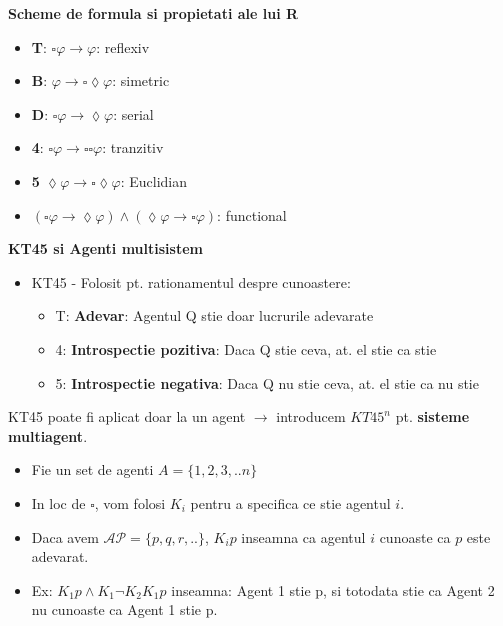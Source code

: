 \documentclass[10pt,a4paper,twocolumn]{report}
\begin{document}
\textbf{Scheme de formula si propietati ale lui R}
\begin{itemize}
\item \textbf{T}: $\square \varphi \rightarrow \varphi$: reflexiv
\item \textbf{B}: $\varphi \rightarrow \square \lozenge \varphi$: simetric
\item \textbf{D}: $\square \varphi \rightarrow \lozenge \varphi$: serial
\item \textbf{4}: $\square \varphi \rightarrow \square \square \varphi$: tranzitiv
\item \textbf{5} $\lozenge \varphi \rightarrow \square \lozenge \varphi$: Euclidian
\item $(\square \varphi \rightarrow \lozenge \varphi) \wedge (\lozenge \varphi \rightarrow \square \varphi)$: functional
\end{itemize}

\textbf{KT45 si Agenti multisistem}
\begin{itemize}

\item KT45 - Folosit pt. rationamentul despre cunoastere:

	\begin{itemize}
	\item T: \textbf{Adevar}: Agentul Q stie doar lucrurile adevarate
	\item 4: \textbf{Introspectie pozitiva}: Daca Q stie ceva, at. el stie ca stie
	\item 5: \textbf{Introspectie negativa}: Daca Q nu stie ceva, at. el stie ca nu stie
	\end{itemize}

\end{itemize}
\vspace{40mm}

KT45 poate fi aplicat doar la un agent $\rightarrow$ introducem $KT45^n$ pt. \textbf{sisteme multiagent}.

\begin{itemize}
\item Fie un set de agenti $A = \{1,2,3,..n\}$
\item In loc de $\square$, vom folosi $K_i$ pentru a specifica ce stie agentul $i$.
\item Daca avem $\mathcal{AP} = \{p, q, r, ..\}$, $K_ip$ inseamna ca agentul $i$ cunoaste ca $p$ este adevarat.
\item Ex: $K_1p \wedge K_1\neg K_2K_1p$ inseamna: Agent 1 stie p, si totodata stie ca Agent 2 nu cunoaste ca Agent 1 stie p.
\end{itemize}
\end{document}
